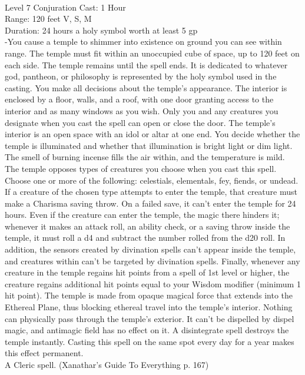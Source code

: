 \documentclass[10pt,twocolumn]{report}
\begin{document}
 \\
Level 7 \quad Conjuration \quad Cast: 1 Hour\\
Range: 120 feet \quad V, S, M\\
Duration: 24 hours \quad a holy symbol worth at least 5 gp\\
-You cause a temple to shimmer into existence on ground you can see within range. The temple must fit within an unoccupied cube of space, up to 120 feet on each side. The temple remains until the spell ends. It is dedicated to whatever god, pantheon, or philosophy is represented by the holy symbol used in the casting.
You make all decisions about the temple’s appearance. The interior is enclosed by a floor, walls, and a roof, with one door granting access to the interior and as many windows as you wish. Only you and any creatures you designate when you cast the spell can open or close the door.
The temple’s interior is an open space with an idol or altar at one end. You decide whether the temple is illuminated and whether that illumination is bright light or dim light. The smell of burning incense fills the air within, and the temperature is mild.
The temple opposes types of creatures you choose when you cast this spell. Choose one or more of the following: celestials, elementals, fey, fiends, or undead. If a creature of the chosen type attempts to enter the temple, that creature must make a Charisma saving throw. On a failed save, it can’t enter the temple for 24 hours. Even if the creature can enter the temple, the magic there hinders it; whenever it makes an attack roll, an ability check, or a saving throw inside the temple, it must roll a d4 and subtract the number rolled from the d20 roll.
In addition, the sensors created by divination spells can’t appear inside the temple, and creatures within can’t be targeted by divination spells.
Finally, whenever any creature in the temple regains hit points from a spell of 1st level or higher, the creature regains additional hit points equal to your Wisdom modifier (minimum 1 hit point).
The temple is made from opaque magical force that extends into the Ethereal Plane, thus blocking ethereal travel into the temple’s interior. Nothing can physically pass through the temple’s exterior. It can’t be dispelled by dispel magic, and antimagic field has no effect on it. A disintegrate spell destroys the temple instantly.
Casting this spell on the same spot every day for a year makes this effect permanent.\\
A Cleric spell. (Xanathar's Guide To Everything p. 167) \\
\end{document}

